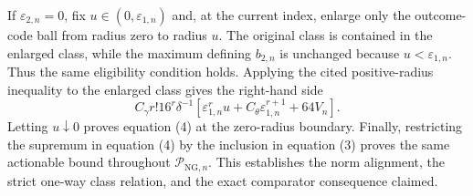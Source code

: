 If \(\varepsilon_{2,n}=0\), fix \(u\in(0,\varepsilon_{1,n})\) and, at the current index, enlarge only the outcome-code ball from radius zero to radius \(u\).  The original class is contained in the enlarged class, while the maximum defining \(b_{2,n}\) is unchanged because \(u<\varepsilon_{1,n}\).  Thus the same eligibility condition holds.  Applying the cited positive-radius inequality to the enlarged class gives the right-hand side
\[
 C_\gamma r!16^r\delta^{-1}
 \left[\varepsilon_{1,n}^r u+C_\theta\varepsilon_{1,n}^{r+1}
 +64V_n\right].
\]
Letting \(u\downarrow0\) proves equation (4) at the zero-radius boundary.  Finally, restricting the supremum in equation (4) by the inclusion in equation (3) proves the same actionable bound throughout \(\mathcal P_{\mathrm{NG},n}\).  This establishes the norm alignment, the strict one-way class relation, and the exact comparator consequence claimed.